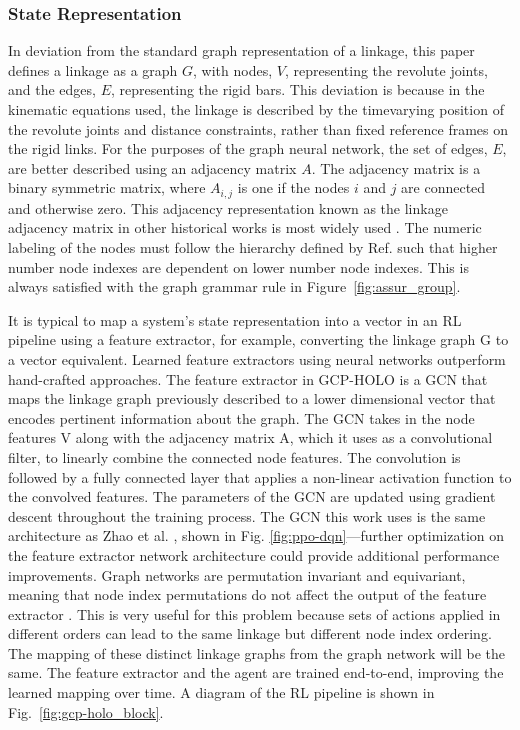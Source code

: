 \subsubsection{State Representation}\label{sec:state-rep} In deviation from the standard graph representation of a linkage, this paper defines a linkage as a graph $G$, with nodes, $V$, representing the revolute joints, and the edges, $E$, representing the rigid bars. This deviation is because in the kinematic equations used, the linkage is described by the timevarying position of the revolute joints and distance constraints, rather than fixed reference frames on the rigid links. For the purposes of the graph neural network, the set of edges, $E$, are better described using an adjacency matrix $A$. The adjacency matrix is a binary symmetric matrix, where $A_{i,j}$ is one if the nodes $i$ and $j$ are connected and otherwise zero. This adjacency representation known as the linkage adjacency matrix in other historical works is most widely used \cite{mruthyunjaya_kinematic_2003}. The numeric labeling of the nodes must follow the hierarchy defined by Ref. \cite{bacher_linkedit_2015} such that higher number node indexes are dependent on lower number node indexes. This is always satisfied with the graph grammar rule in Figure~\ref{fig:assur_group}.

It is typical to map a system’s state representation into a vector in an RL pipeline using a feature extractor, for example, converting the linkage graph G to a vector equivalent. Learned feature extractors using neural networks outperform hand-crafted approaches. The feature extractor in GCP-HOLO is a GCN \cite{kipf_semi-supervised_2016} that maps the linkage graph previously described to a lower dimensional vector that encodes pertinent information about the graph. The GCN takes in the node features V along with the adjacency matrix A, which it uses as a convolutional filter, to linearly combine the connected node features. The convolution is followed by a fully connected layer that applies a non-linear activation function to the convolved features. The parameters of the GCN are updated using gradient descent throughout the training process. The GCN this work uses is the same architecture as Zhao et al. \cite{zhao_robogrammar_2020}, shown in Fig. \ref{fig:ppo-dqn}—further optimization on the feature extractor network architecture could provide additional performance improvements. Graph networks are permutation invariant and equivariant, meaning that node index permutations do not affect the output of the feature extractor \cite{maron_invariant_2019}. This is very useful for this problem because sets of actions applied in different orders can lead to the same linkage but different node index ordering. The mapping of these distinct linkage graphs from the graph network will be the same. The feature extractor and the agent are trained end-to-end, improving the learned mapping over time. A diagram of the RL pipeline is shown in Fig.~\ref{fig:gcp-holo_block}.

